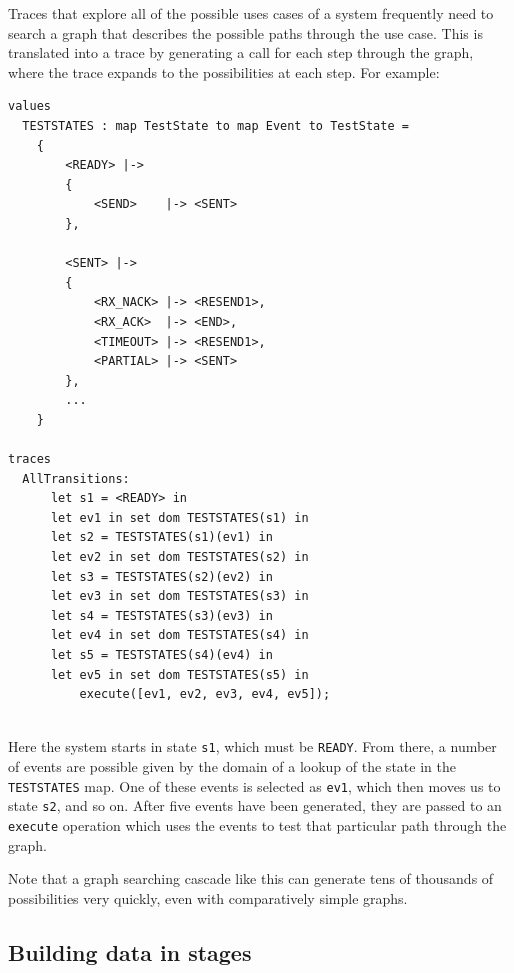 \documentclass{overturerepchap}
\begin{document}
Traces that explore all of the possible uses cases of a system frequently
need to search a graph that describes the possible paths through the use case.
This is translated into a trace by generating a call for each step through the
graph, where the trace expands to the possibilities at each step. For example:
\scriptsize
\begin{lstlisting}
values
  TESTSTATES : map TestState to map Event to TestState =
    {
        <READY> |->
        {
            <SEND>    |-> <SENT>
        },

        <SENT> |->
        {
            <RX_NACK> |-> <RESEND1>,
            <RX_ACK>  |-> <END>,
            <TIMEOUT> |-> <RESEND1>,
            <PARTIAL> |-> <SENT>
        },
        ...
    }

traces
  AllTransitions:
      let s1 = <READY> in
      let ev1 in set dom TESTSTATES(s1) in
      let s2 = TESTSTATES(s1)(ev1) in
      let ev2 in set dom TESTSTATES(s2) in
      let s3 = TESTSTATES(s2)(ev2) in
      let ev3 in set dom TESTSTATES(s3) in
      let s4 = TESTSTATES(s3)(ev3) in
      let ev4 in set dom TESTSTATES(s4) in
      let s5 = TESTSTATES(s4)(ev4) in
      let ev5 in set dom TESTSTATES(s5) in
          execute([ev1, ev2, ev3, ev4, ev5]);
 
\end{lstlisting}
\normalsize
Here the system starts in state \texttt{s1}, which must be \texttt{READY}. From
there, a number of events are possible given by the domain of a lookup of the
state in the \texttt{TESTSTATES} map. One of these events is selected as
\texttt{ev1}, which then moves us to state \texttt{s2}, and so on. After five
events have been generated, they are passed to an \texttt{execute} operation which
uses the events to test that particular path through the graph.

Note that a graph searching cascade like this can generate tens of thousands of
possibilities very quickly, even with comparatively simple graphs.

\subsection{Building data in stages}
\end{document}
